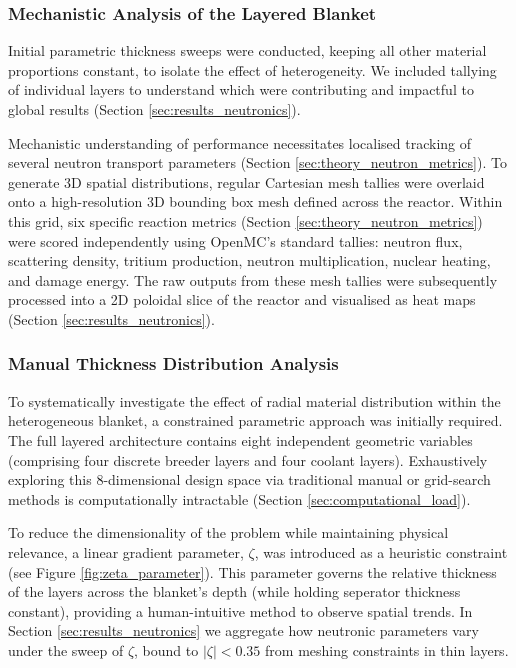 \documentclass[11pt]{article}
\begin{document}
\subsubsection{Mechanistic Analysis of the Layered Blanket}
Initial parametric thickness sweeps were conducted, keeping all other material proportions constant,
to isolate the effect of heterogeneity. We included tallying of individual layers to understand
which were contributing and impactful to global results (Section \ref{sec:results_neutronics}).

Mechanistic understanding of performance necessitates localised tracking of several neutron
transport parameters (Section \ref{sec:theory_neutron_metrics}). To generate 3D spatial
distributions, regular Cartesian mesh tallies were overlaid onto a high-resolution 3D bounding box
mesh defined across the reactor. Within this grid, six specific reaction metrics (Section
\ref{sec:theory_neutron_metrics}) were scored independently using OpenMC's standard tallies: neutron
flux, scattering density, tritium production, neutron multiplication, nuclear heating, and damage
energy. The raw outputs from these mesh tallies were subsequently processed into a 2D poloidal slice
of the reactor and visualised as heat maps (Section \ref{sec:results_neutronics}).

\subsubsection{Manual Thickness Distribution Analysis}
To systematically investigate the effect of radial material distribution within the heterogeneous
blanket, a constrained parametric approach was initially required. The full layered architecture
contains eight independent geometric variables (comprising four discrete breeder layers and four
coolant layers). Exhaustively exploring this 8-dimensional design space via traditional manual or
grid-search methods is computationally intractable (Section \ref{sec:computational_load}).

To reduce the dimensionality of the problem while maintaining physical relevance, a linear gradient
parameter, $\zeta$, was introduced as a heuristic constraint (see Figure \ref{fig:zeta_parameter}).
This parameter governs the relative thickness of the layers across the blanket's depth (while
holding seperator thickness constant), providing a human-intuitive method to observe spatial trends.
In Section \ref{sec:results_neutronics} we aggregate how neutronic parameters vary under the sweep
of $\zeta$, bound to $|\zeta|<0.35$ from meshing constraints in thin layers.
\end{document}
